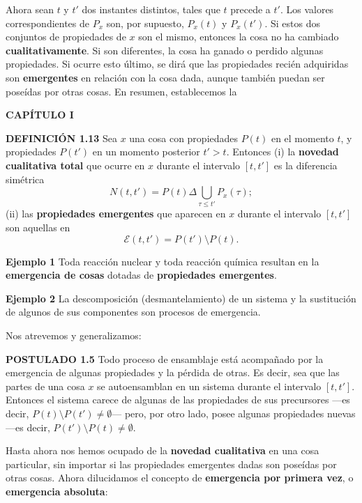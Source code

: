 {Ahora sean $t$ y $t'$ dos instantes distintos, tales que $t$ precede a $t'$. Los valores correspondientes de $P_x$ son, por supuesto, $P_x(t)$ y $P_x(t')$. Si estos dos conjuntos de propiedades de $x$ son el mismo, entonces la cosa no ha cambiado \textbf{cualitativamente}. Si son diferentes, la cosa ha ganado o perdido algunas propiedades. Si ocurre esto último, se dirá que las propiedades recién adquiridas son \textbf{emergentes} en relación con la cosa dada, aunque también puedan ser poseídas por otras cosas. En resumen, establecemos la
}
\newpage
\fancyhf{}
\fancyhead[l]{\thepage}
\begin{center}
{\fontsize{16}{18}\selectfont \textbf{CAPÍTULO I}}
\end{center}
\vspace{0.5cm}

{\fontsize{13}{15}\selectfont
\textbf{DEFINICIÓN 1.13} Sea $x$ una cosa con propiedades $P(t)$ en el momento $t$, y propiedades $P(t')$ en un momento posterior $t' > t$. Entonces
(i) la \textbf{novedad cualitativa total} que ocurre en $x$ durante el intervalo $[t, t']$ es la diferencia simétrica
$$ N(t, t') = P(t) \Delta \bigcup_{\tau \le t'} P_x(\tau); $$
(ii) las \textbf{propiedades emergentes} que aparecen en $x$ durante el intervalo $[t, t']$ son aquellas en
$$ \mathcal{E}(t, t') = P(t') \setminus P(t). $$

\textbf{Ejemplo 1} Toda reacción nuclear y toda reacción química resultan en la \textbf{emergencia de cosas} dotadas de \textbf{propiedades emergentes}.

\textbf{Ejemplo 2} La descomposición (desmantelamiento) de un sistema y la sustitución de algunos de sus componentes son procesos de emergencia.

Nos atrevemos y generalizamos:

\textbf{POSTULADO 1.5} Todo proceso de ensamblaje está acompañado por la emergencia de algunas propiedades y la pérdida de otras. Es decir, sea que las partes de una cosa $x$ se autoensamblan en un sistema durante el intervalo $[t, t']$. Entonces el sistema carece de algunas de las propiedades de sus precursores —es decir, $P(t) \setminus P(t') \neq \emptyset$— pero, por otro lado, posee algunas propiedades nuevas —es decir, $P(t') \setminus P(t) \neq \emptyset$.

Hasta ahora nos hemos ocupado de la \textbf{novedad cualitativa} en una cosa particular, sin importar si las propiedades emergentes dadas son poseídas por otras cosas. Ahora dilucidamos el concepto de \textbf{emergencia por primera vez}, o \textbf{emergencia absoluta}:

}
